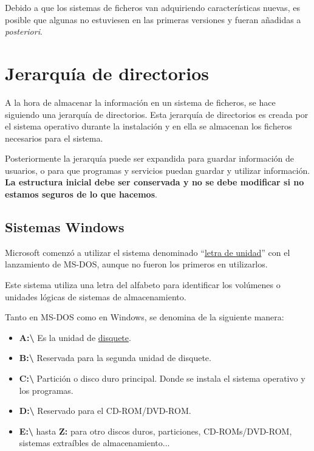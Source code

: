 Debido a que los sistemas de ficheros van adquiriendo características nuevas, es posible que algunas no estuviesen en las primeras versiones y fueran añadidas a \textit{posteriori}.


\section{Jerarquía de directorios}
A la hora de almacenar la información en un sistema de ficheros, se hace siguiendo una jerarquía de directorios. Esta jerarquía de directorios es creada por el sistema operativo durante la instalación y en ella se almacenan los ficheros necesarios para el sistema.

Posteriormente la jerarquía puede ser expandida para guardar información de usuarios, o para que programas y servicios puedan guardar y utilizar información. \textbf{La estructura inicial debe ser conservada y no se debe modificar si no estamos seguros de lo que hacemos}.


\subsection{Sistemas Windows}
Microsoft comenzó a utilizar el sistema denominado “\href{https://es.wikipedia.org/wiki/Letra_de_unidad}{letra de unidad}” con el lanzamiento de MS-DOS, aunque no fueron los primeros en utilizarlos.

Este sistema utiliza una letra del alfabeto para identificar los volúmenes o unidades lógicas de sistemas de almacenamiento.

Tanto en MS-DOS como en Windows, se denomina de la siguiente manera:

\begin{itemize}
    \item \textbf{A:\textbackslash} Es la unidad de \hyperlink{disquete}{disquete}.
    \item \textbf{B:\textbackslash} Reservada para la segunda unidad de disquete.
    \item \textbf{C:\textbackslash} Partición o disco duro principal. Donde se instala el sistema operativo y los programas.
    \item \textbf{D:\textbackslash} Reservado para el CD-ROM/DVD-ROM.
    \item \textbf{E:\textbackslash} hasta \textbf{Z:} para otro discos duros, particiones, CD-ROMs/DVD-ROM, sistemas extraíbles de almacenamiento...
\end{itemize}

